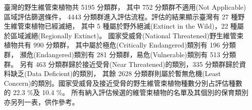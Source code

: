 臺灣的野生維管束植物共 5195 分類群，
其中 752 分類群不適用(Not Applicable)區域評估篩選條件，
4443 分類群進入評估流程。評估的結果顯示臺灣有 27 種野生維管束植物已經滅絕，
其中 5 種屬於野外絕滅(Extinct in the Wild)，22 種屬於區域滅絕(Regionally Extinct)。
國家受威脅(National Threatened)野生維管束植物共有 990 分類群，
其中屬於極危(Critically Endangered)類別有 196 分類群，
瀕危(Endangered)類別有 281 分類群，易危(Vulnerable)類別有 513 分類群。
另有 463 分類群歸於接近受脅(Near Threatened)的類別，335 分類群歸於資料缺乏(Data Deficient)的類別，
其餘 2628 分類群則屬於暫無危機(Least Concern)的類別。國家受威脅及接近受脅的野生維管束植物種數分別占評估種數的 22.3 \%及 10.4 \%。
所有納入評估候選的維管束植物的名單及其個別的保育類別亦另列一表，供作參考。
